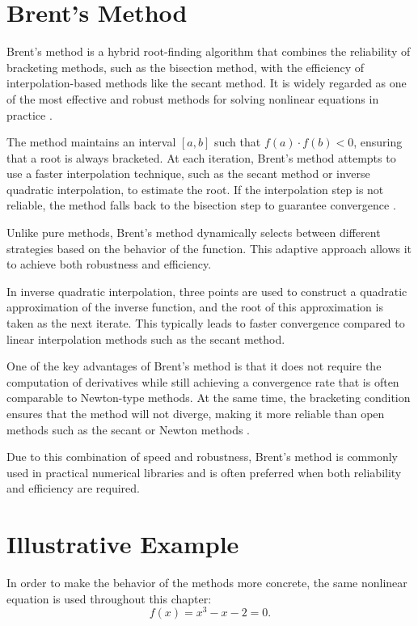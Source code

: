 \section{Brent's Method}

Brent's method is a hybrid root-finding algorithm that combines the reliability of bracketing methods, such as the bisection method, with the efficiency of interpolation-based methods like the secant method. It is widely regarded as one of the most effective and robust methods for solving nonlinear equations in practice \cite{atkinson, chapra}.

The method maintains an interval \([a, b]\) such that \( f(a) \cdot f(b) < 0 \), ensuring that a root is always bracketed. At each iteration, Brent's method attempts to use a faster interpolation technique, such as the secant method or inverse quadratic interpolation, to estimate the root. If the interpolation step is not reliable, the method falls back to the bisection step to guarantee convergence \cite{cs357}.

Unlike pure methods, Brent's method dynamically selects between different strategies based on the behavior of the function. This adaptive approach allows it to achieve both robustness and efficiency.

In inverse quadratic interpolation, three points are used to construct a quadratic approximation of the inverse function, and the root of this approximation is taken as the next iterate. This typically leads to faster convergence compared to linear interpolation methods such as the secant method.

One of the key advantages of Brent's method is that it does not require the computation of derivatives while still achieving a convergence rate that is often comparable to Newton-type methods. At the same time, the bracketing condition ensures that the method will not diverge, making it more reliable than open methods such as the secant or Newton methods \cite{chapra}.

Due to this combination of speed and robustness, Brent's method is commonly used in practical numerical libraries and is often preferred when both reliability and efficiency are required.

\section{Illustrative Example}

In order to make the behavior of the methods more concrete, the same nonlinear equation is used throughout this chapter:
\begin{equation}
f(x)=x^3-x-2=0.
\end{equation}

